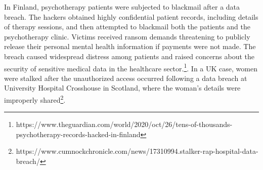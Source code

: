 \documentclass{article}
\begin{document}
In Finland, psychotherapy patients were subjected to blackmail after a data breach. The hackers obtained highly confidential patient records, including details of therapy sessions, and then attempted to blackmail both the patients and the psychotherapy clinic. Victims received ransom demands threatening to publicly release their personal mental health information if payments were not made. The breach caused widespread distress among patients and raised concerns about the security of sensitive medical data in the healthcare sector.\footnote{https://www.theguardian.com/world/2020/oct/26/tens-of-thousands-psychotherapy-records-hacked-in-finland}. 
In a UK case, women were stalked after the unauthorized access occurred following a data breach at University Hospital Crosshouse in Scotland, where the woman's details were improperly shared\footnote{https://www.cumnockchronicle.com/news/17310994.stalker-rap-hospital-data-breach/}. 
\newline
\end{document}
